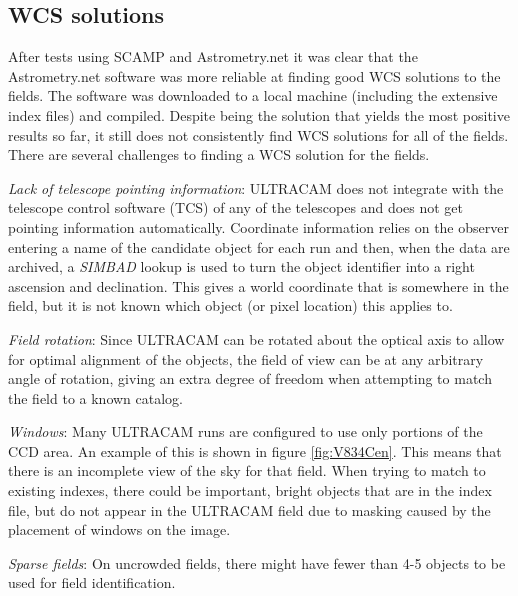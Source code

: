 
\subsection{WCS solutions}\label{sect:astrometry}

After tests using SCAMP \citep{scamp} and Astrometry.net \citep{astrometry} it was clear that the Astrometry.net software was more reliable at finding good WCS solutions to the fields. The software was downloaded to a local machine (including the extensive index files) and compiled. Despite being the solution that yields the most positive results so far, it still does not consistently find WCS solutions for all of the fields. There are several challenges to finding a WCS solution for the fields.

\emph{Lack of telescope pointing information}: ULTRACAM does not integrate with the telescope control software (TCS) of any of the telescopes and does not get pointing information automatically. Coordinate information relies on the observer entering a name of the candidate object for each run and then, when the data are archived, a \emph{SIMBAD} lookup is used to turn the object identifier into a right ascension and declination. This gives a world coordinate that is somewhere in the field, but it is not known which object (or pixel location) this applies to.  

\emph{Field rotation}: Since ULTRACAM can be rotated about the optical axis to allow for optimal alignment of the objects, the field of view can be at any arbitrary angle of rotation, giving an extra degree of freedom when attempting to match the field to a known catalog. 

\emph{Windows}: Many ULTRACAM runs are configured to use only portions of the CCD area. An example of this is shown in figure \ref{fig:V834Cen}. This means that there is an incomplete view of the sky for that field. When trying to match to existing indexes, there could be important, bright objects that are in the index file, but do not appear in the ULTRACAM field due to masking caused by the placement of windows on the image.

\emph{Sparse fields}: On uncrowded fields, there might have fewer than 4-5 objects to be used for field identification. 

